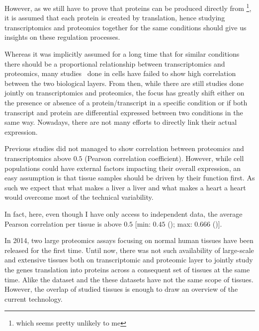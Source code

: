However, as we still have to prove that proteins can be produced directly
from \DNA\footnote{which seems pretty unlikely to me}, it is assumed that
each protein is created by translation, hence studying
transcriptomics and proteomics together for the same conditions should give us
insights on these regulation processes.

Whereas it was implicitly assumed for a long time that for similar conditions
there should be a proportional relationship between transcriptomics and
proteomics, many studies\
done in cells have failed to show high correlation between the two biological
layers. From then, while there are still studies done jointly on transcriptomics
and proteomics, the focus has greatly shift either on the presence or absence of
a protein/transcript in a specific condition or if both transcript and protein
are differential expressed between two conditions in the same way.
Nowadays, there are not many efforts to directly link their actual expression.

Previous studies did not managed to show correlation between proteomics and
transcriptomics above $0.5$ (Pearson correlation coefficient).
However, while cell populations could have external factors impacting their
overall expression, an easy assumption is that tissue samples should be driven
by their function first. As such we expect that what makes a liver a liver and
what makes a heart a heart would overcome most of the technical variability.

In fact, here, even though I have only access to independent data, the average
Pearson correlation per tissue is above $0.5$
[min: $0.45$ (); max: $0.666$ ()].

In 2014, two large proteomics assays focusing on normal human tissues have been
released for the first time.
Until now, there was not such availability of large-scale and extensive tissues
both on transcriptomic and proteomic layer to jointly study the genes
translation into proteins across a consequent set of tissues
at the same time. Alike the  dataset and the 
these datasets have not the same scope of tissues. However, the overlap of
studied tissues is enough to draw an overview of the current technology.

